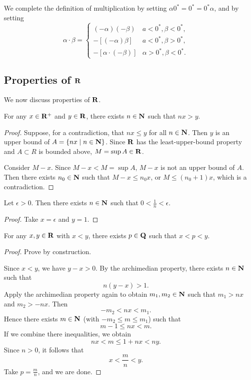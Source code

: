 We complete the definition of multiplication by setting $\alpha0^*=0^*=0^*\alpha$, and by setting
\[\alpha\cdot\beta=\begin{cases}
(-\alpha)(-\beta)&a<0^*,\beta<0^*,\\
-[(-\alpha)\beta]&a<0^*,\beta>0^*,\\
-[\alpha\cdot(-\beta)]&\alpha>0^*,\beta<0^*.
\end{cases}\]

\subsection{Properties of $\RR$}
We now discuss properties of $\RR$.

\begin{theorem}[$\RR$ is archimedian]\label{thrm:r-archimedian}
For any $x\in\mathbf R^+$ and $y\in\mathbf R$, there exists $n\in\mathbf N$ such that $nx>y$.
\end{theorem}

\begin{proof}
Suppose, for a contradiction, that $nx\le y$ for all $n\in\mathbf N$. Then $y$ is an upper bound of $A=\{nx\mid n\in\mathbf N\}$. Since $\RR$ has the least-upper-bound property and $A\subset R$ is bounded above, $M=\sup A\in\mathbf R$.

Consider $M-x$. Since $M-x<M=\sup A$, $M-x$ is not an upper bound of $A$. Then there exists $n_0\in\mathbf N$ such that $M-x\le n_0x$, or $M\le(n_0+1)x$, which is a contradiction.
\end{proof}

\begin{corollary}
Let $\epsilon>0$. Then there exists $n\in\mathbf N$ such that $0<\frac{1}{n}<\epsilon$.
\end{corollary}

\begin{proof}
Take $x=\epsilon$ and $y=1$.
\end{proof}

\begin{theorem}[$\QQ$ is dense in $\RR$]
For any $x,y\in\mathbf R$ with $x<y$, there exists $p\in\mathbf Q$ such that $x<p<y$.
\end{theorem}

\begin{proof}
Prove by construction.

Since $x<y$, we have $y-x>0$. By the archimedian property, there exists $n\in\mathbf N$ such that
\[n(y-x)>1.\]
Apply the archimedian property again to obtain $m_1,m_2\in\mathbf N$ such that $m_1>nx$ and $m_2>-nx$. Then
\[-m_2<nx<m_1.\]
Hence there exists $m\in\mathbf N$ (with $-m_2\le m\le m_1$) such that
\[m-1\le nx<m.\]
If we combine there inequalities, we obtain
\[nx<m\le1+nx<ny.\]
Since $n>0$, it follows that
\[x<\frac{m}{n}<y.\]
Take $p=\frac{m}{n}$, and we are done.
\end{proof}

